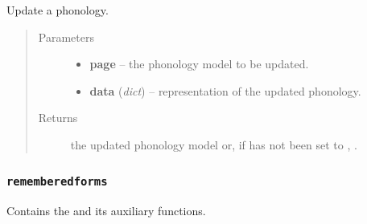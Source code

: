 \documentclass[letterpaper,10pt,english]{sphinxmanual}
\begin{document}

\begin{fulllineitems}
\label{api:onlinelinguisticdatabase.controllers.phonologies.updatePhonology}
Update a phonology.
\begin{quote}\begin{description}
\item[{Parameters}] \leavevmode\begin{itemize}
\item {} 
\textbf{page} -- the phonology model to be updated.

\item {} 
\textbf{data} (\emph{dict}) -- representation of the updated phonology.

\end{itemize}

\item[{Returns}] \leavevmode
the updated phonology model or, if  has not been set
to , .

\end{description}\end{quote}

\end{fulllineitems}



\subsubsection{\texttt{rememberedforms}}
\label{api:rememberedforms}\label{api:module-onlinelinguisticdatabase.controllers.rememberedforms}
Contains the {\hyperref[api:onlinelinguisticdatabase.controllers.rememberedforms.RememberedformsController]{}} and its auxiliary functions.
\label{api:module-rememberedforms}
\end{document}
